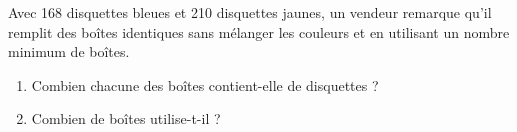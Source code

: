 
Avec 168 disquettes bleues et 210 disquettes jaunes, un vendeur
remarque qu'il remplit des boîtes identiques sans mélanger les
couleurs et en utilisant un nombre minimum de boîtes.
\begin{enumerate}
  \item Combien chacune des boîtes contient-elle de disquettes ?
  \item Combien de boîtes utilise-t-il ?
\end{enumerate}
